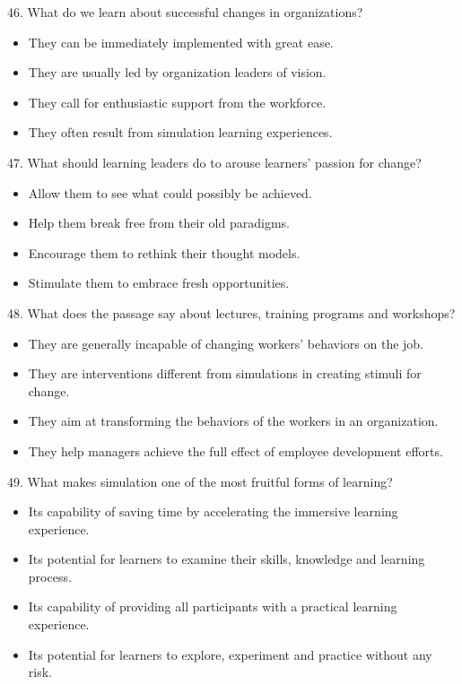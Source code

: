 \documentclass[UTF8,11pt]{ctexart}
\begin{document}
46. What do we learn about successful changes in organizations?


\begin{itemize}[leftmargin=2em,itemsep=.2em,topsep=.4em]\item[A.] They can be immediately implemented with great ease.
\item[B.] They are usually led by organization leaders of vision.
\item[C.] They call for enthusiastic support from the workforce.
\item[D.] They often result from simulation learning experiences.
\end{itemize}

47. What should learning leaders do to arouse learners’ passion for change?


\begin{itemize}[leftmargin=2em,itemsep=.2em,topsep=.4em]\item[A.] Allow them to see what could possibly be achieved.
\item[B.] Help them break free from their old paradigms.
\item[C.] Encourage them to rethink their thought models.
\item[D.] Stimulate them to embrace fresh opportunities.
\end{itemize}

48. What does the passage say about lectures, training programs and workshops?


\begin{itemize}[leftmargin=2em,itemsep=.2em,topsep=.4em]\item[A.] They are generally incapable of changing workers’ behaviors on the job.
\item[B.] They are interventions different from simulations in creating stimuli for change.
\item[C.] They aim at transforming the behaviors of the workers in an organization.
\item[D.] They help managers achieve the full effect of employee development efforts.
\end{itemize}

49. What makes simulation one of the most fruitful forms of learning?


\begin{itemize}[leftmargin=2em,itemsep=.2em,topsep=.4em]\item[A.] Its capability of saving time by accelerating the immersive learning experience.
\item[B.] Its potential for learners to examine their skills, knowledge and learning process.
\item[C.] Its capability of providing all participants with a practical learning experience.
\item[D.] Its potential for learners to explore, experiment and practice without any risk.
\end{itemize}
\end{document}

